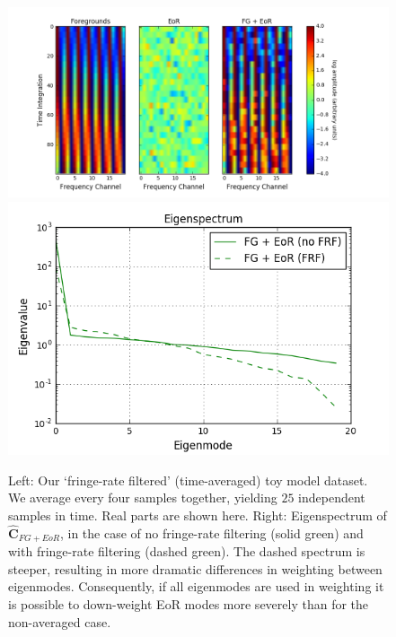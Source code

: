 \documentclass[preprint2,numberedappendix,tighten]{aastex6}  %
\begin{document}
\begin{figure}
	\centering
	\includegraphics[trim={1.5cm 0.2cm 1.5cm 0.3cm},clip,height=0.29\textwidth]{plots/toy_sigloss5.png}
	\includegraphics[trim={0.3cm 0.2cm 0.3cm 0.3cm},clip,height=0.29\textwidth]{plots/toy_sigloss15.png}
	\caption{Left: Our `fringe-rate filtered' (time-averaged) toy model dataset. We average every four samples together, 
yielding $25$ independent samples in time. Real parts are shown here. Right: Eigenspectrum of $\hat{\textbf{C}}_{FG+EoR}$, 
in the case of no fringe-rate filtering (solid green) and with fringe-rate filtering (dashed green). The dashed spectrum is steeper, 
resulting in more dramatic differences in weighting between eigenmodes. Consequently, if all eigenmodes are used in weighting 
it is possible to down-weight EoR modes more severely than for the non-averaged case.}
	\label{fig:toy_sigloss5}
\end{figure}
\end{document}
